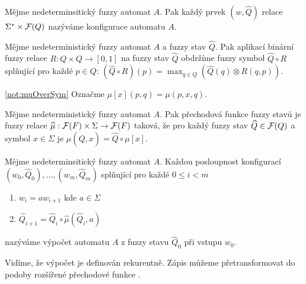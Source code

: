 \documentclass[a4paper,10pt]{article}
\begin{document}
\begin{definition}
  Mějme nedeterminsitický fuzzy automat $A$. Pak každý prvek $(w, \widehat{Q})$ relace $\Sigma^* \times \mathcal{F}(Q)$ nazýváme konfigurace automatu $A$.
\end{definition}


\begin{definition}
 Mějme nedeterministický fuzzy automat $A$ a fuzzy stav $\widehat{Q}$. Pak aplikací binární fuzzy relace $R: Q \times Q \rightarrow [0, 1]$ na fuzzy stav $\widehat{Q}$ obdržíme fuzzy symbol $\widehat{Q} \circ R$ splňující pro každé $p \in Q$: $(\widehat{Q} \circ R )(p) = \max_{q \in Q} (\widehat{Q}(q) \otimes R(q, p))$.
 
\end{definition}

\begin{notation} \ref{not:muOverSym}
 Označme $\mu[x](p, q) = \mu(p, x, q)$.
\end{notation}

\begin{definition}\label{def-PreFunFuzzStav}
 Mějme nedeterministický fuzzy automat $A$. Pak přechodová funkce fuzzy stavů je fuzzy relace $\widehat{\mu}: \mathcal{F}(F) \times \Sigma \rightarrow \mathcal{F}(F)$ taková, že pro každý fuzzy stav $\widehat{Q} \in \mathcal{F}(Q)$ a symbol $x \in \Sigma$ je $\widehat{\mu}(\widehat{Q}, x) = \widehat{Q} \circ \mu[x]$.
\end{definition}

\begin{definition}
  Mějme nedeterminsitický fuzzy automat $A$. Každou posloupnost konfigurací $(w_0, \widehat{Q}_0), \dots, (w_m, \widehat{Q}_m)$ splňující pro každé $0 \leq i < m$
  \begin{enumerate}
   \item $w_{i} = a w_{i+1}$ kde $a \in \Sigma$
   \item $\widehat{Q}_{i+1} = \widehat{Q}_{i} \circ \widehat{\mu}(\widehat{Q}_{i}, a)$
  \end{enumerate}
  nazýváme výpočet automatu $A$ z fuzzy stavu $\widehat{Q}_0$ při vstupu $w_0$.
\end{definition}

Vidíme, že výpočet je definován rekurentně. Zápis můžeme přetransformovat do podoby rozšířené přechodové funkce \cite{IgnCirBog-DetFuzAutMemValComResLat}.
\end{document}
